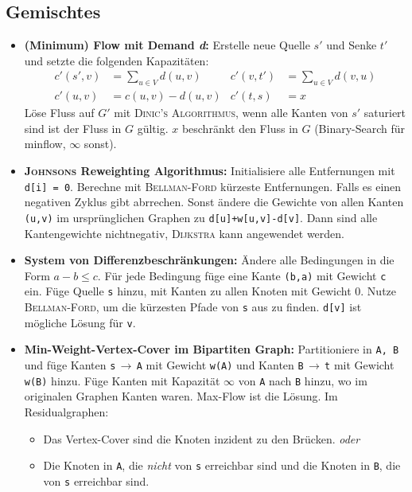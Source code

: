 \subsection{Gemischtes}
\begin{itemize}
	\item \textbf{(Minimum) Flow mit Demand \textit{d}:}
	Erstelle neue Quelle $s'$ und Senke $t'$ und setzte die folgenden Kapazitäten:
	\begin{align*}
		c'(s',v)&=\sum_{u\in{}V}d(u,v)&c'(v,t')&=\sum_{u\in{}V}d(v,u)\\[-0.5ex]
		c'(u,v)&=c(u,v)-d(u,v)&c'(t,s)&=x
	\end{align*}
	Löse Fluss auf $G'$ mit \textsc{Dinic's Algorithmus}, wenn alle Kanten von $s'$ saturiert sind ist der Fluss in $G$ gültig. $x$ beschränkt den Fluss in $G$ (Binary-Search für minflow, $\infty$ sonst).
	\item \textbf{\textsc{Johnsons} Reweighting Algorithmus:}
	Initialisiere alle Entfernungen mit \texttt{d[i] = 0}. Berechne mit \textsc{Bellman-Ford} kürzeste Entfernungen.
	Falls es einen negativen Zyklus gibt abrrechen.
	Sonst ändere die Gewichte von allen Kanten \texttt{(u,v)} im ursprünglichen Graphen zu \texttt{d[u]+w[u,v]-d[v]}.
	Dann sind alle Kantengewichte nichtnegativ, \textsc{Dijkstra} kann angewendet werden.

	\item \textbf{System von Differenzbeschränkungen:}
	Ändere alle Bedingungen in die Form $a-b \leq c$.
	Für jede Bedingung füge eine Kante \texttt{(b,a)} mit Gewicht \texttt{c} ein.
	Füge Quelle \texttt{s} hinzu, mit Kanten zu allen Knoten mit Gewicht 0.
	Nutze \textsc{Bellman-Ford}, um die kürzesten Pfade von \texttt{s} aus zu finden.
	\texttt{d[v]} ist mögliche Lösung für \texttt{v}.

	\item \textbf{Min-Weight-Vertex-Cover im Bipartiten Graph:}
	Partitioniere in \texttt{A, B} und füge Kanten \texttt{s}\,$\rightarrow$\,\texttt{A} mit Gewicht \texttt{w(A)} und Kanten  \texttt{B}\,$\rightarrow$\,\texttt{t} mit Gewicht \texttt{w(B)} hinzu.
	Füge Kanten mit Kapazität $\infty$ von \texttt{A} nach \texttt{B} hinzu, wo im originalen Graphen Kanten waren.
	Max-Flow ist die Lösung.\newline
	Im Residualgraphen:
	\begin{itemize}
		\item Das Vertex-Cover sind die Knoten inzident zu den Brücken. \emph{oder}
		\item Die Knoten in \texttt{A}, die \emph{nicht} von \texttt{s} erreichbar sind und die Knoten in \texttt{B}, die von \texttt{s} erreichbar sind.
	\end{itemize}


\end{itemize}
